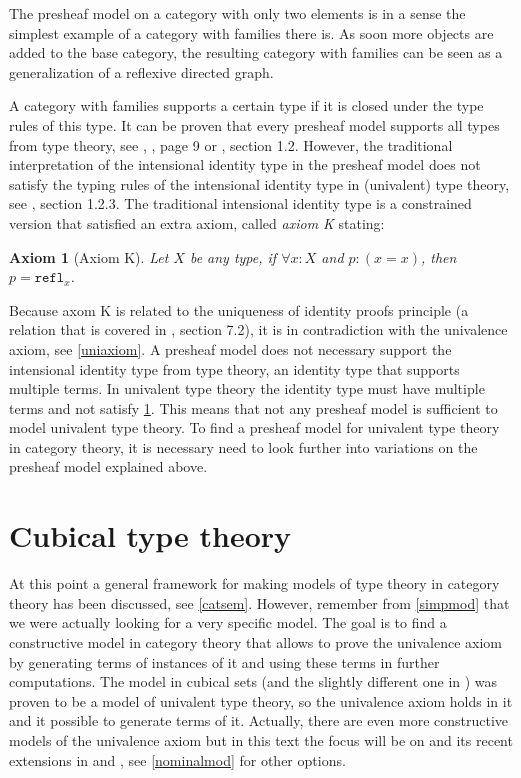 \documentclass[12pt,a4paper,twoside,xetex]{book}
\newcommand{\keyword}[1]{\emph{#1}\index{#1}}
\newtheorem{axiom}[theorem]{Axiom}
\newcommand{\op}[1]{\mathtt{#1}}
\begin{document}
The presheaf model on a category with only two elements is in a sense the 
simplest example of a category with families there is. As soon more objects are 
added to the base category, the resulting category with families can be seen as 
a generalization of a reflexive directed graph. 

A category with families supports a certain type if it is closed under the type 
rules of this type.  It can be proven that every presheaf model supports all 
types from type theory, see \cite{Hofmann1997}, \cite{Nuyts2018}, page 9 or 
\cite{Huber2016}, section 1.2. However, the traditional interpretation of the 
intensional identity type in the presheaf model does not satisfy the typing 
rules of the intensional identity type in (univalent) type theory, see 
\cite{Huber2016}, section 1.2.3. The traditional intensional identity type is a 
constrained version that satisfied an extra axiom, called \keyword{axiom K} 
stating: 

\begin{axiom}[Axiom K]\label{axiomk}
Let $X$ be any type, if $\forall x : X$ and $p : (x = x)$, then $p = 
\op{refl}_x$.  
\end{axiom}

Because axom K is related to the uniqueness of identity proofs principle (a 
relation that is covered in \cite{Voevodsky2013}, section 7.2), it is in 
contradiction with the univalence axiom, see \cref{uniaxiom}. A presheaf model 
does not necessary support the intensional identity type from type theory, an 
identity type that supports multiple terms. In univalent type theory the 
identity type must have multiple terms and not satisfy \cref{axiomk}. This 
means that not any presheaf model is sufficient to model univalent type theory. 
To find a presheaf model for univalent type theory in category theory, it is 
necessary need to look further into variations on the presheaf model explained 
above.  

\chapter{Cubical type theory}\label{cubical}

At this point a general framework for making models of type 
theory in category theory has been discussed, see \cref{catsem}. However, 
remember from \cref{simpmod} that we were actually looking for a very specific 
model. The goal is to find a constructive model in category theory that allows 
to prove the univalence axiom by generating terms of instances of it and using 
these terms in further computations. The model in cubical sets \cite{Bezem2014} 
(and the slightly different one in \cite{Cohen2016}) was proven to be a model 
of univalent type theory, so the univalence axiom holds in it and it possible 
to generate terms of it. Actually, there are even more constructive models of 
the univalence axiom but in this text the focus will be on \cite{Cohen2016} and 
its recent extensions in \cite{Coquand2018} and \cite{Moertberg2018}, see 
\cref{nominalmod} for other options. 
\end{document}
